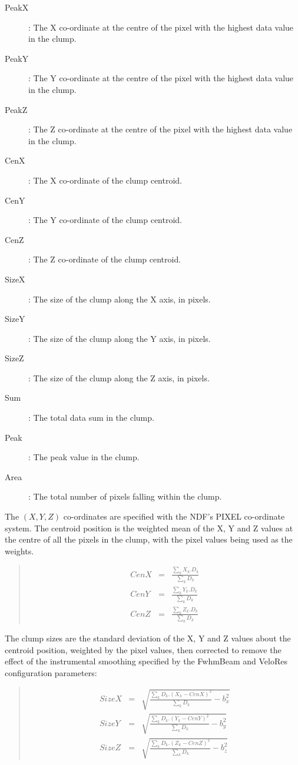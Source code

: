 \documentclass[twoside,11pt]{article}
\renewcommand{\_}{\texttt{\symbol{95}}}
\newenvironment{myquote}{\begin{quote}\begin{small}}{\end{small}\end{quote}}
\begin{document}
\begin{description}
\item[PeakX]: The X co-ordinate at the centre of the pixel with the
highest data value in the clump.
\item[PeakY]: The Y co-ordinate at the centre of the pixel with the
highest data value in the clump.
\item[PeakZ]: The Z co-ordinate at the centre of the pixel with the
highest data value in the clump.
\item[CenX]: The X co-ordinate of the clump centroid.
\item[CenY]: The Y co-ordinate of the clump centroid.
\item[CenZ]: The Z co-ordinate of the clump centroid.
\item[SizeX]: The size of the clump along the X axis, in pixels.
\item[SizeY]: The size of the clump along the Y axis, in pixels.
\item[SizeZ]: The size of the clump along the Z axis, in pixels.
\item[Sum]: The total data sum in the clump.
\item[Peak]: The peak value in the clump.
\item[Area]: The total number of pixels falling within the clump.
\end{description}

The $(X,Y,Z)$ co-ordinates are specified with the NDF's PIXEL co-ordinate
system. The centroid position is the weighted mean of the X, Y and Z values
at the centre of all the pixels in the clump, with the pixel values being
used as the weights.

\begin{myquote}
\begin{eqnarray*}
  CenX & = & \frac{\sum_{k}X_{k}.D_{k}}{\sum_{k}D_{k}} \\
  CenY & = & \frac{\sum_{k}Y_{k}.D_{k}}{\sum_{k}D_{k}} \\
  CenZ & = & \frac{\sum_{k}Z_{k}.D_{k}}{\sum_{k}D_{k}}
\end{eqnarray*}
\end{myquote}

The clump sizes are the standard deviation of the X, Y and Z values about the 
centroid position, weighted by the pixel values, then corrected to remove the 
effect of the instrumental smoothing specified by the FwhmBeam and VeloRes
configuration parameters:

\begin{myquote}
\begin{eqnarray*}
  SizeX & = & \sqrt{\frac{\sum_{k}D_{k}.(X_{k}-CenX)^{2}}{\sum_{k}D_{k}} - b_{x}^{2} } \\
  SizeY & = & \sqrt{\frac{\sum_{k}D_{k}.(Y_{k}-CenY)^{2}}{\sum_{k}D_{k}} - b_{y}^{2} } \\
  SizeZ & = & \sqrt{\frac{\sum_{k}D_{k}.(Z_{k}-CenZ)^{2}}{\sum_{k}D_{k}} - b_{z}^{2} }
\end{eqnarray*}
\end{myquote}
\end{document}

